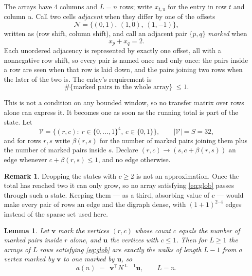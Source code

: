 \documentclass[11pt,a4paper]{article}
\theoremstyle{plain}
\newtheorem{lemma}[theorem]{Lemma}
\theoremstyle{definition}
\newtheorem{remark}[theorem]{Remark}
\begin{document}
The arrays have $4$ columns and $L=n$ rows; write $x_{t,u}$ for the entry in
row $t$ and column $u$. Call two cells \emph{adjacent} when they differ by one of the
offsets
\[
\mathcal N=\{(0,1),\ (1,0),\ (1,-1)\},
\]
written as (row shift, column shift), and call an adjacent pair $\{p,q\}$
\emph{marked} when
\[
x_{p}+x_{q}=2 .
\]
Each unordered adjacency is represented by exactly one offset, all with a nonnegative row
shift, so every pair is named once and only once: the pairs inside a row are seen when
that row is laid down, and the pairs joining two rows when the later of the two is. The
entry's requirement is
\begin{equation}\label{eq:glob}
\#\{\text{marked pairs in the whole array}\}\;\le1.
\end{equation}

This is not a condition on any bounded window, so no transfer matrix over rows alone can
express it. It becomes one as soon as the running total is part of the state. Let
\[
\mathcal V=\bigl\{(r,c):\ r\in\{0,\dots,1\}^{4},\ c\in\{0,1\}\bigr\},
\qquad |\mathcal V|=S=32,
\]
and for rows $r,s$ write $\beta(r,s)$ for the number of marked pairs joining them plus the
number of marked pairs inside $s$. Declare $(r,c)\to(s,c+\beta(r,s))$ an edge whenever
$c+\beta(r,s)\le1$, and no edge otherwise.

\begin{remark}
Dropping the states with $c\ge2$ is not an approximation. Once the total has reached two it
can only grow, so no array satisfying \eqref{eq:glob} passes through such a state. Keeping
them --- as a third, absorbing value of $c$ --- would make every pair of rows an edge and
the digraph dense, with $(1+1)^{2\cdot4}$ edges instead of the sparse set used here.
\end{remark}

\begin{lemma}\label{lem:walk}
Let $\mathbf{v}$ mark the vertices $(r,c)$ whose count $c$ equals the number of marked pairs
inside $r$ alone, and $\mathbf{u}$ the vertices with $c\le1$. Then for $L\ge1$ the arrays
of $L$ rows satisfying \eqref{eq:glob} are exactly the walks of length $L-1$ from a
vertex marked by $\mathbf{v}$ to one marked by $\mathbf{u}$, so
\[
a(n)\;=\;\,\mathbf{v}^{\!\top}N^{\,L-1}\mathbf{u},\qquad L=n .
\]
\end{lemma}
\end{document}
